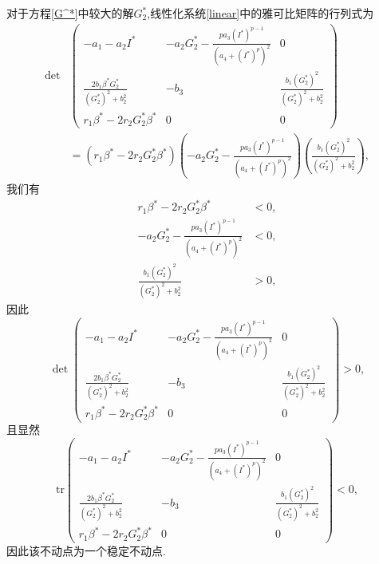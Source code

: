 对于方程\ref{G^*}中较大的解$G_2^*$,线性化系统\ref{linear}中的雅可比矩阵的行列式为
\begin{equation}
    \begin{aligned}
        \det&\begin{pmatrix}
            -a_1-a_2I^*                                & -a_2G_2^*-\frac{pa_3(I^*)^{p-1}}{(a_4+(I^*)^p)^2} & 0                                      \\
            \frac{2b_1\beta^*G_2^*}{(G_2^*)^2 + b_2^2} & -b_3                                              & \frac{b_1(G_2^*)^2}{(G_2^*)^2 + b_2^2} \\
            r_1\beta^*-2r_2G_2^*\beta^*                & 0                                                 & 0
        \end{pmatrix}\\
        &=(r_1\beta^*-2r_2G_2^*\beta^*)(-a_2G_2^*-\frac{pa_3(I^*)^{p-1}}{(a_4+(I^*)^p)^2})( \frac{b_1(G_2^*)^2}{(G_2^*)^2 + b_2^2}),
    \end{aligned}
\end{equation}
我们有
\begin{equation}
    \begin{aligned}
        r_1\beta^*-2r_2G_2^*\beta^*                       & <0, \\
        -a_2G_2^*-\frac{pa_3(I^*)^{p-1}}{(a_4+(I^*)^p)^2} & <0, \\
        \frac{b_1(G_2^*)^2}{(G_2^*)^2 + b_2^2}            & >0,
    \end{aligned}
\end{equation}
因此
\begin{equation}
    \det \begin{pmatrix}
        -a_1-a_2I^*                                & -a_2G_2^*-\frac{pa_3(I^*)^{p-1}}{(a_4+(I^*)^p)^2} & 0                                      \\
        \frac{2b_1\beta^*G_2^*}{(G_2^*)^2 + b_2^2} & -b_3                                              & \frac{b_1(G_2^*)^2}{(G_2^*)^2 + b_2^2} \\
        r_1\beta^*-2r_2G_2^*\beta^*                & 0                                                 & 0
    \end{pmatrix}>0,
\end{equation}
且显然
    \begin{equation}
        \text{tr}\begin{pmatrix}
            -a_1-a_2I^*                                & -a_2G_2^*-\frac{pa_3(I^*)^{p-1}}{(a_4+(I^*)^p)^2} & 0                                      \\
            \frac{2b_1\beta^*G_2^*}{(G_2^*)^2 + b_2^2} & -b_3                                              & \frac{b_1(G_2^*)^2}{(G_2^*)^2 + b_2^2} \\
            r_1\beta^*-2r_2G_2^*\beta^*                & 0                                                 & 0
        \end{pmatrix}<0,
    \end{equation}
    因此该不动点为一个稳定不动点. 
    
